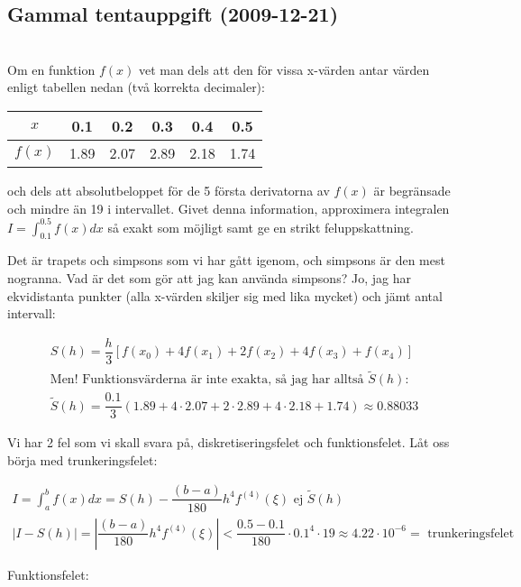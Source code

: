 \subsection{Gammal tentauppgift (2009-12-21)}\hfill\\

\noindent Om en funktion $f(x)$ vet man dels att den för vissa x-värden antar värden enligt tabellen nedan (två korrekta decimaler):

\begin{center}
  \begin{tabular}{|c|c|c|c|c|c|}
    \hline
    $x$&0.1&0.2&0.3&0.4&0.5\\
    \hline
    $f(x)$&1.89&2.07&2.89&2.18&1.74\\
    \hline
  \end{tabular}
\end{center}
\par\bigskip
\noindent och dels att absolutbeloppet för de 5 första derivatorna av $f(x)$ är begränsade och mindre än 19 i intervallet. Givet denna information, approximera integralen $I=\int_{0.1}^{0.5}f(x)dx$ så exakt som möjligt samt ge en strikt feluppskattning.
\par\bigskip
\noindent Det är trapets och simpsons som vi har gått igenom, och simpsons är den mest nogranna. Vad är det som gör att jag kan använda simpsons? Jo, jag har ekvidistanta punkter (alla x-värden skiljer sig med lika mycket) och jämt antal intervall:


\begin{equation*}
  \begin{gathered}
    S(h) = \dfrac{h}{3}[f(x_0)+4f(x_1)+2f(x_2)+4f(x_3)+f(x_4)]\\
    \text{Men! Funktionsvärderna är inte exakta, så jag har alltså $\tilde{S}(h)$: }\\
    \tilde{S}(h)=\dfrac{0.1}{3}(1.89+4\cdot2.07+2\cdot2.89+4\cdot2.18+1.74)\approx 0.88033
  \end{gathered}
\end{equation*}
\par\bigskip
\noindent Vi har 2 fel som vi skall svara på, diskretiseringsfelet och funktionsfelet. Låt oss börja med trunkeringsfelet:


\begin{equation*}
  \begin{gathered}
    I = \int_{a}^{b}f(x)dx=S(h) - \dfrac{(b-a)}{180}h^4f^{(4)}(\xi) \text{ ej $\tilde{S}(h)$}\\
    |I-S(h)|=|\dfrac{(b-a)}{180}h^4f^{(4)}(\xi)|< \dfrac{0.5-0.1}{180}\cdot0.1^4\cdot19\approx 4.22\cdot10^{-6} = \text{ trunkeringsfelet}
  \end{gathered}
\end{equation*}
\par\bigskip
\noindent Funktionsfelet:


